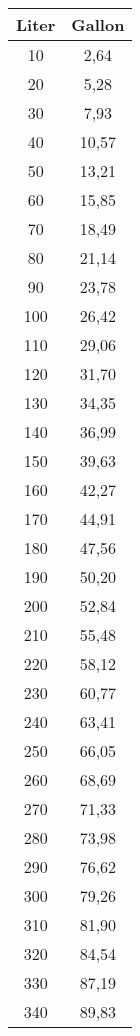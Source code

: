 \documentclass[10pt]{article}
\begin{document}
\begin{table}[!ht]
  \centering
  \tiny
  \begin{tabular}{|c|c|}
  \hline
  \cellcolor{black!90}\color{white}\textbf{Liter} & \cellcolor{black!90}\color{white}\textbf{Gallon} \\ \hline
      10 & 2,64 \\ \hline
      20 & 5,28 \\ \hline
      30 & 7,93 \\ \hline
      40 & 10,57 \\ \hline
      50 & 13,21 \\ \hline
      60 & 15,85 \\ \hline
      70 & 18,49 \\ \hline
      80 & 21,14 \\ \hline
      90 & 23,78 \\ \hline
      100 & 26,42 \\ \hline
      110 & 29,06 \\ \hline
      120 & 31,70 \\ \hline
      130 & 34,35 \\ \hline
      140 & 36,99 \\ \hline
      150 & 39,63 \\ \hline
      160 & 42,27 \\ \hline
      170 & 44,91 \\ \hline
      180 & 47,56 \\ \hline
      190 & 50,20 \\ \hline
      200 & 52,84 \\ \hline
      210 & 55,48 \\ \hline
      220 & 58,12 \\ \hline
      230 & 60,77 \\ \hline
      240 & 63,41 \\ \hline
      250 & 66,05 \\ \hline
      260 & 68,69 \\ \hline
      270 & 71,33 \\ \hline
      280 & 73,98 \\ \hline
      290 & 76,62 \\ \hline
      300 & 79,26 \\ \hline
      310 & 81,90 \\ \hline
      320 & 84,54 \\ \hline
      330 & 87,19 \\ \hline
      340 & 89,83 \\ \hline

\end{tabular}
\end{table}
\end{document}

